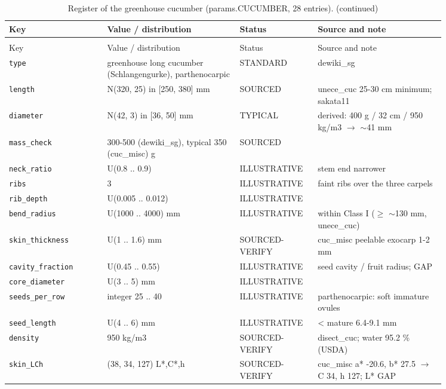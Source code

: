 \documentclass[10.5pt,a4paper]{article}
\begin{document}
{\scriptsize\begin{longtable}{@{}p{0.2\linewidth}p{0.27\linewidth}p{0.12\linewidth}p{0.26\linewidth}@{}}\caption{Register of the greenhouse cucumber (params.CUCUMBER, 28 entries).}\\\toprule Key & Value / distribution & Status & Source and note \\\midrule\endfirsthead
\caption[]{Register of the greenhouse cucumber (params.CUCUMBER, 28 entries). (continued)}\\\toprule Key & Value / distribution & Status & Source and note \\\midrule\endhead
\texttt{type} & greenhouse long cucumber (Schlangengurke), parthenocarpic & STANDARD & dewiki\_sg \\
\texttt{length} & N(320, 25) in [250, 380] mm & SOURCED & unece\_cuc 25-30 cm minimum; sakata11 \\
\texttt{diameter} & N(42, 3) in [36, 50] mm & TYPICAL & derived: 400 g / 32 cm / 950 kg/m3 $\to$ $\sim$41 mm \\
\texttt{mass\_\allowbreak{}check} & 300-500 (dewiki\_sg), typical 350 (cuc\_misc) g & SOURCED &  \\
\texttt{neck\_\allowbreak{}ratio} & U(0.8 .. 0.9) & ILLUSTRATIVE & stem end narrower \\
\texttt{ribs} & 3 & ILLUSTRATIVE & faint ribs over the three carpels \\
\texttt{rib\_\allowbreak{}depth} & U(0.005 .. 0.012) & ILLUSTRATIVE &  \\
\texttt{bend\_\allowbreak{}radius} & U(1000 .. 4000) mm & ILLUSTRATIVE & within Class I ($\ge$ $\sim$130 mm, unece\_cuc) \\
\texttt{skin\_\allowbreak{}thickness} & U(1 .. 1.6) mm & SOURCED-VERIFY & cuc\_misc peelable exocarp 1-2 mm \\
\texttt{cavity\_\allowbreak{}fraction} & U(0.45 .. 0.55) & ILLUSTRATIVE & seed cavity / fruit radius; GAP \\
\texttt{core\_\allowbreak{}diameter} & U(3 .. 5) mm & ILLUSTRATIVE &  \\
\texttt{seeds\_\allowbreak{}per\_\allowbreak{}row} & integer 25 .. 40 & ILLUSTRATIVE & parthenocarpic: soft immature ovules \\
\texttt{seed\_\allowbreak{}length} & U(4 .. 6) mm & ILLUSTRATIVE & < mature 6.4-9.1 mm \\
\texttt{density} & 950 kg/m3 & SOURCED-VERIFY & disect\_cuc; water 95.2 \% (USDA) \\
\texttt{skin\_\allowbreak{}LCh} & (38, 34, 127) L*,C*,h & SOURCED-VERIFY & cuc\_misc a* -20.6, b* 27.5 $\to$ C 34, h 127; L* GAP \\

\end{longtable}}
\end{document}
